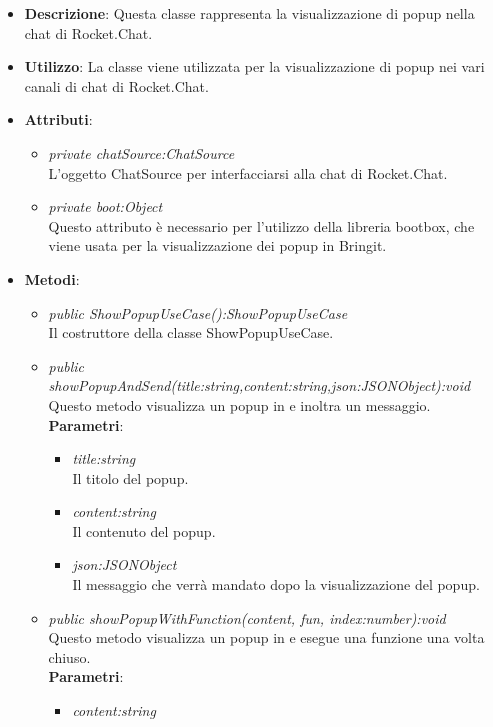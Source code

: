 \begin{itemize}
\item \textbf{Descrizione}: Questa classe rappresenta la visualizzazione di popup nella chat di Rocket.Chat.
\item \textbf{Utilizzo}: La classe viene utilizzata per la visualizzazione di popup nei vari canali di chat di Rocket.Chat.
\item \textbf{Attributi}: 
	\begin{itemize}
	\item \textit{private chatSource:ChatSource}\\
	L'oggetto ChatSource per interfacciarsi alla chat di Rocket.Chat.
	\item \textit{private boot:Object}\\
	Questo attributo è necessario per l'utilizzo della libreria bootbox, che viene usata per la visualizzazione dei popup in Bringit.
	\end{itemize}
\item \textbf{Metodi}:
	\begin{itemize}
	\item \textit{public ShowPopupUseCase():ShowPopupUseCase}\\
	Il costruttore della classe ShowPopupUseCase.
	\item \textit{public showPopupAndSend(title:string,content:string,json:JSONObject):void}\\
	Questo metodo visualizza un popup in  e inoltra un messaggio.
			\\ \textbf{Parametri}: \begin{itemize}
				\item \textit{title:string}\\
				Il titolo del popup.
				\item \textit{content:string}\\
				Il contenuto del popup.
				\item \textit{json:JSONObject}\\
				Il messaggio che verrà mandato dopo la visualizzazione del popup.
			\end{itemize}
	\item \textit{public showPopupWithFunction(content, fun, index:number):void}\\
	Questo metodo visualizza un popup in  e esegue una funzione una volta chiuso.
			\\ \textbf{Parametri}: \begin{itemize}
				\item \textit{content:string}\\

\end{itemize}
\end{itemize}
\end{itemize}
